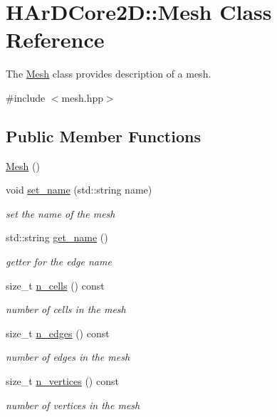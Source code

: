 \hypertarget{classHArDCore2D_1_1Mesh}{}\section{H\+Ar\+D\+Core2D\+:\+:Mesh Class Reference}
\label{classHArDCore2D_1_1Mesh}


The \hyperlink{classHArDCore2D_1_1Mesh}{Mesh} class provides description of a mesh.  




{\ttfamily \#include $<$mesh.\+hpp$>$}

\subsection*{Public Member Functions}
\begin{DoxyCompactItemize}
\item 
\hyperlink{classHArDCore2D_1_1Mesh_a2af137f1571af89172b9c102302c416b}{Mesh} ()
\item 
void \hyperlink{group__Mesh_ga6ac77eb1c0d7ed0ccd8567ca03321531}{set\+\_\+name} (std\+::string name)
\begin{DoxyCompactList}\small\item\em set the name of the mesh \end{DoxyCompactList}\item 
std\+::string \hyperlink{group__Mesh_ga084bd89b4d3767370cbb2da9ffd8ac87}{get\+\_\+name} ()
\begin{DoxyCompactList}\small\item\em getter for the edge name \end{DoxyCompactList}\item 
size\+\_\+t \hyperlink{group__Mesh_ga2202a0715196c41356692d8adcfe3893}{n\+\_\+cells} () const
\begin{DoxyCompactList}\small\item\em number of cells in the mesh \end{DoxyCompactList}\item 
size\+\_\+t \hyperlink{group__Mesh_ga55a1cd5db98bbce8c73ab86b4527859c}{n\+\_\+edges} () const
\begin{DoxyCompactList}\small\item\em number of edges in the mesh \end{DoxyCompactList}\item 
size\+\_\+t \hyperlink{group__Mesh_gadb4a39bfc5444953e7799d28b8e37563}{n\+\_\+vertices} () const
\begin{DoxyCompactList}\small\item\em number of vertices in the mesh \end{DoxyCompactList}\item 

\end{DoxyCompactItemize}

